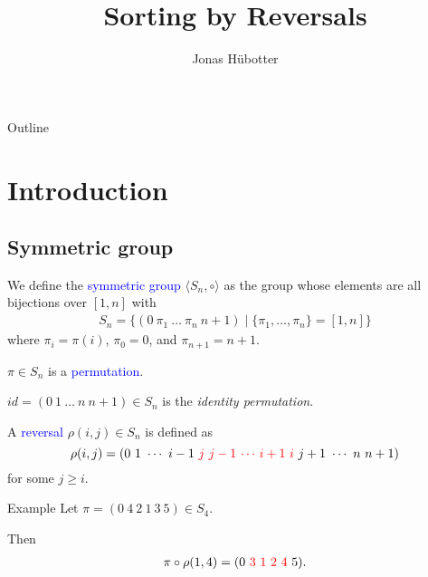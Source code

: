 \documentclass{beamer}
\title[Sorting by Reversals]{Sorting by Reversals}
\author{Jonas Hübotter}
\theoremstyle{definition}
\def\spadding{\vspace{0.25cm}}
\def\b{\textcolor{blue}}
\def\r{\textcolor{red}}
\begin{document}
\begin{frame}
  \titlepage
\end{frame}

\begin{frame}{Outline}
 \tableofcontents
\end{frame}

\section{Introduction}

\subsection{Symmetric group}

\begin{frame}

\begin{definition}
We define the \b{symmetric group} $\langle S_n, \circ \rangle$ as the group whose elements are all bijections over $[1,n]$ \pause with
\begin{align*}
    S_n = \{(0\ \pi_1\ \dots\ \pi_n\ n+1) \mid \{\pi_1, \dots, \pi_n\} = [1,n]\}
\end{align*}
where $\pi_i = \pi(i)$, $\pi_0 = 0$, and $\pi_{n+1} = n+1$.\pause\spadding

$\pi \in S_n$ is a \b{permutation}.\pause\spadding

$id = (0\ 1\ \dots\ n\ n+1) \in S_n$ is the \textit{identity permutation}.
\end{definition}

\end{frame}

\begin{frame}

\begin{definition}
A \b{reversal} $\rho(i,j) \in S_n$ is defined as
\[
    \rho(i,j) = (0\ 1\ \cdots\ i-1\ \r j\ \r{j-1}\ \r \cdots\ \r{i+1}\ \r i\ j+1\ \cdots\ n\ n+1)
\]
for some $j \geq i$.
\end{definition}\pause

\begin{exampleblock}{Example}
Let $\pi = (0\ 4\ 2\ 1\ 3\ 5) \in S_4$. \par
Then
\begin{align*}
    \pi \circ \rho(1,4) = (0\ \r{3\ 1\ 2\ 4}\ 5).
\end{align*}
\end{exampleblock}

\end{frame}
\end{document}
